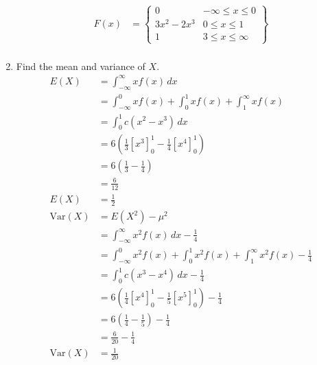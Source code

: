 \documentclass{article}
\newcommand{\var}{\text{Var}}
\begin{document}
\begin{enumerate}[\quad(a)]
\begin{align*}
		F(x) &= \left\{
		\begin{array}{ll}
		0 & -\infty \le x \leq 0 \\
		3x^2 - 2x^3 & 0 \le x \le 1\\
		1 & 3 \le x \le \infty
		\end{array} \right\} \\
	\end{align*}
	\item Find the mean and variance of $X$.
	\begin{align*}
		E(X) &= \int_{-\infty}^{\infty} xf(x)\, dx\\
		&= \int_{-\infty}^{0} xf(x) + \int_{0}^{1} xf(x) + \int_{1}^{\infty} xf(x)\\
		&= \int_0^1 c(x^2-x^3) \, dx \\
		&= 6 \left( \frac{1}{3} [x^3]_0^1 - \frac{1}{4} [x^4]_0^1 \right)\\
		&= 6\left(\frac{1}{3} - \frac{1}{4}\right)\\
		&= \tfrac{6}{12} \\
		E(X) &= \frac{1}{2} \\
		\var(X) &= E(X^2) - \mu^2\\
		&= \int_{-\infty}^{\infty} x^2 f(x)\, dx - \tfrac{1}{4}\\
		&= \int_{-\infty}^{0} x^2f(x) + \int_{0}^{1} x^2f(x) + \int_{1}^{\infty} x^2f(x) - \tfrac{1}{4}\\
		&= \int_0^1 c(x^3-x^4) \, dx - \tfrac{1}{4}\\
		&= 6 \left( \frac{1}{4} [x^4]_0^1 - \frac{1}{5} [x^5]_0^1 \right) - \tfrac{1}{4}\\
		&= 6\left(\frac{1}{4} - \frac{1}{5}\right) - \tfrac{1}{4}\\
		&= \tfrac{6}{20} - \tfrac{1}{4} \\
		\var(X) &= \frac{1}{20} \\
	\end{align*}
\end{enumerate}
\end{document}
